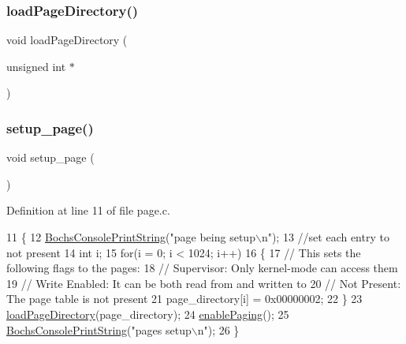 \subsubsection{\texorpdfstring{load\+Page\+Directory()}{loadPageDirectory()}}
{\footnotesize\ttfamily void load\+Page\+Directory (\begin{DoxyParamCaption}\item[{unsigned int $\ast$}]{ }\end{DoxyParamCaption})}

\mbox{\label{a00077_a51f6a37816540dea572d38f2713e9f5a_a51f6a37816540dea572d38f2713e9f5a}} 
\subsubsection{\texorpdfstring{setup\+\_\+page()}{setup\_page()}}
{\footnotesize\ttfamily void setup\+\_\+page (\begin{DoxyParamCaption}{ }\end{DoxyParamCaption})}



Definition at line 11 of file page.\+c.


\begin{DoxyCode}
11                   \{
12     \hyperlink{a00029_a19e1f554d03c977f8b947f21489daa41_a19e1f554d03c977f8b947f21489daa41}{BochsConsolePrintString}(\textcolor{stringliteral}{"page being setup\(\backslash\)n"});
13     \textcolor{comment}{//set each entry to not present}
14     \textcolor{keywordtype}{int} i;
15     \textcolor{keywordflow}{for}(i = 0; i < 1024; i++)
16     \{
17         \textcolor{comment}{// This sets the following flags to the pages:}
18         \textcolor{comment}{//   Supervisor: Only kernel-mode can access them}
19         \textcolor{comment}{//   Write Enabled: It can be both read from and written to}
20         \textcolor{comment}{//   Not Present: The page table is not present}
21         page\_directory[i] = 0x00000002;
22     \}
23     \hyperlink{a00077_abfdf37b9c42cafa83b39f1a41264989c_abfdf37b9c42cafa83b39f1a41264989c}{loadPageDirectory}(page\_directory);
24     \hyperlink{a00077_a8fe3a9cca4b2ccd7a2743e9943880a32_a8fe3a9cca4b2ccd7a2743e9943880a32}{enablePaging}();
25     \hyperlink{a00029_a19e1f554d03c977f8b947f21489daa41_a19e1f554d03c977f8b947f21489daa41}{BochsConsolePrintString}(\textcolor{stringliteral}{"pages setup\(\backslash\)n"});
26 \}
\end{DoxyCode}
